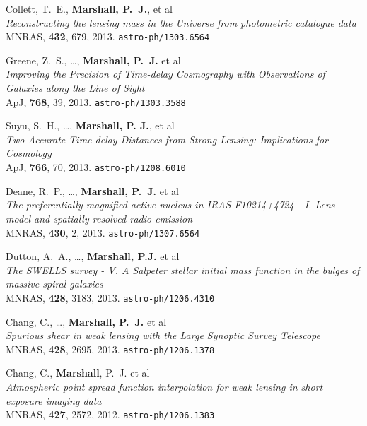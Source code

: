 \begin{revnumerate}

\item{Collett, T.~E., \textbf{Marshall, P.~J.}, et al\\
\textit{Reconstructing the lensing mass in the Universe from photometric catalogue data}\\
MNRAS, \textbf{432}, 679, 2013.
\texttt{astro-ph/1303.6564}
}

\item{Greene, Z.~S., \ldots, \textbf{Marshall, P.~J.} et al\\
\textit{Improving the Precision of Time-delay Cosmography with Observations of Galaxies along the Line of Sight}\\
ApJ, \textbf{768}, 39, 2013.
\texttt{astro-ph/1303.3588}
}

\item{Suyu, S.~H., \ldots, \textbf{Marshall, P. J.}, et al\\
\textit{Two Accurate Time-delay Distances from Strong Lensing: Implications for Cosmology}\\
ApJ, \textbf{766}, 70, 2013.
\texttt{astro-ph/1208.6010}
}

\item{{Deane}, R.~P., \ldots, \textbf{Marshall, P.~J.} et al\\
\textit{The preferentially magnified active nucleus in IRAS F10214+4724 - I. Lens model and spatially resolved radio emission}\\
MNRAS, \textbf{430}, 2, 2013.
\texttt{astro-ph/1307.6564}
}

\item{Dutton, A.~A., \ldots, \textbf{Marshall, P.J.} et al\\
\textit{The SWELLS survey - V. A Salpeter stellar initial mass function in the bulges of massive spiral galaxies}\\
MNRAS, \textbf{428}, 3183, 2013.
\texttt{astro-ph/1206.4310}
}

\item{Chang, C., \ldots, \textbf{Marshall, P.~J.} et al\\
\textit{Spurious shear in weak lensing with the Large Synoptic Survey Telescope}\\
MNRAS, \textbf{428}, 2695, 2013.
\texttt{astro-ph/1206.1378}
}

\item{{Chang}, C., \textbf{Marshall}, P.~J. et al\\
\textit{Atmospheric point spread function interpolation for weak lensing in short exposure imaging data}\\
MNRAS, \textbf{427}, 2572, 2012.
\texttt{astro-ph/1206.1383}
}


\end{revnumerate}
